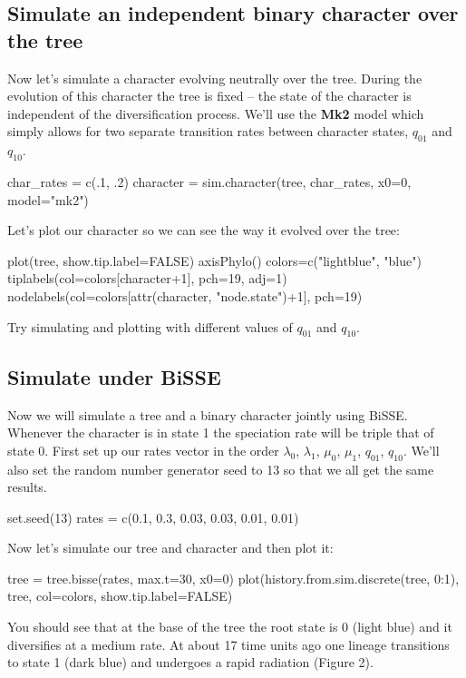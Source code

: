 \documentclass[11pt]{article}
\begin{document}
\subsection{Simulate an independent binary character over the tree}

Now let's simulate a character evolving neutrally over
the tree. During the evolution of this character the tree
is fixed -- the state of the character is independent of
the diversification process.
We'll use the \textbf{Mk2} model which simply
allows for two separate transition rates between
character states, $q_{01}$ and $q_{10}$.
\begin{code}
char_rates = c(.1, .2)
character = sim.character(tree, char_rates, x0=0, model="mk2")
\end{code}
Let's plot our character so we can see the way it evolved
over the tree:
\begin{code}
plot(tree, show.tip.label=FALSE)
axisPhylo()
colors=c("lightblue", "blue")
tiplabels(col=colors[character+1], pch=19, adj=1)
nodelabels(col=colors[attr(character, "node.state")+1], pch=19)
\end{code}
Try simulating and plotting with different 
values of $q_{01}$ and $q_{10}$.

\subsection{Simulate under BiSSE}

Now we will simulate a tree and a binary character jointly
using BiSSE. 
Whenever the character is in state 1 the speciation
rate will be triple that of state 0.
First set up our rates vector in the order
$\lambda_0$, 
$\lambda_1$,
$\mu_0$,
$\mu_1$,
$q_{01}$,
$q_{10}$.
We'll also set the random number generator seed to 13 so
that we all get the same results.
\begin{code}
set.seed(13)
rates =  c(0.1, 0.3, 0.03, 0.03, 0.01, 0.01)
\end{code}
Now let's simulate our tree and character
and then plot it:
\begin{code}
tree = tree.bisse(rates, max.t=30, x0=0)
plot(history.from.sim.discrete(tree, 0:1), tree, col=colors, show.tip.label=FALSE)
\end{code}
You should see that at the base of the
tree the root state is 0 (light blue)
and it diversifies at a medium rate.
At about 17 time units ago one lineage transitions to state 1 (dark blue)
and undergoes a rapid radiation (Figure 2).
\end{document}
